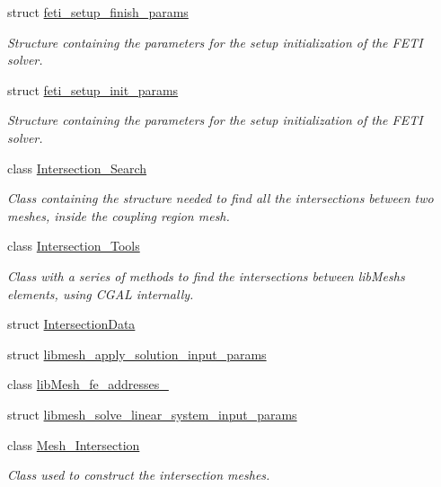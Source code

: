 \begin{DoxyCompactItemize}
struct \hyperlink{structcarl_1_1feti__setup__finish__params}{feti\+\_\+setup\+\_\+finish\+\_\+params}
\begin{DoxyCompactList}\small\item\em Structure containing the parameters for the setup initialization of the F\+E\+T\+I solver. \end{DoxyCompactList}\item 
struct \hyperlink{structcarl_1_1feti__setup__init__params}{feti\+\_\+setup\+\_\+init\+\_\+params}
\begin{DoxyCompactList}\small\item\em Structure containing the parameters for the setup initialization of the F\+E\+T\+I solver. \end{DoxyCompactList}\item 
class \hyperlink{classcarl_1_1_intersection___search}{Intersection\+\_\+\+Search}
\begin{DoxyCompactList}\small\item\em Class containing the structure needed to find all the intersections between two meshes, inside the coupling region mesh. \end{DoxyCompactList}\item 
class \hyperlink{classcarl_1_1_intersection___tools}{Intersection\+\_\+\+Tools}
\begin{DoxyCompactList}\small\item\em Class with a series of methods to find the intersections between lib\+Mesh\textquotesingle{}s elements, using C\+G\+A\+L internally. \end{DoxyCompactList}\item 
struct \hyperlink{structcarl_1_1_intersection_data}{Intersection\+Data}
\item 
struct \hyperlink{structcarl_1_1libmesh__apply__solution__input__params}{libmesh\+\_\+apply\+\_\+solution\+\_\+input\+\_\+params}
\item 
class \hyperlink{classcarl_1_1lib_mesh__fe__addresses__3}{lib\+Mesh\+\_\+fe\+\_\+addresses\+\_}
\item 
struct \hyperlink{structcarl_1_1libmesh__solve__linear__system__input__params}{libmesh\+\_\+solve\+\_\+linear\+\_\+system\+\_\+input\+\_\+params}
\item 
class \hyperlink{classcarl_1_1_mesh___intersection}{Mesh\+\_\+\+Intersection}
\begin{DoxyCompactList}\small\item\em Class used to construct the intersection meshes. \end{DoxyCompactList}\item 

\end{DoxyCompactItemize}
